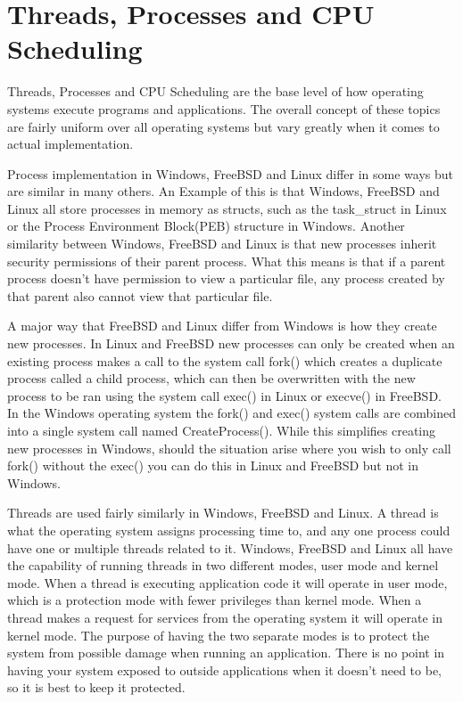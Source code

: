 \documentclass[10pt,serif,draftclsnofoot,onecolumn]{IEEEtran}
\begin{document}
\section{Threads, Processes and CPU Scheduling}
	\par
	Threads, Processes and CPU Scheduling are the base level of how operating systems execute programs and applications. The overall concept of these topics are fairly uniform over all operating systems but vary greatly when it comes to actual implementation.
	\newline
	\par
	Process implementation in Windows, FreeBSD and Linux differ in some ways but are similar in many others. An Example of this is that Windows, FreeBSD and Linux all store processes in memory as structs, such as the task\_struct in Linux\cite{2} or the Process Environment Block(PEB) structure in Windows\cite{3}. Another similarity between Windows, FreeBSD and Linux is that new processes inherit security permissions of their parent process\cite{4}. What this means is that if a parent process doesn't have permission to view a particular file, any process created by that parent also cannot view that particular file.
	\newline
	\par
	A major way that FreeBSD and Linux differ from Windows is how they create new processes. In Linux and FreeBSD new processes can only be created when an existing process makes a call to the system call fork() which creates a duplicate process called a child process, which can then be overwritten with the new process to be ran using the system call exec() in Linux or execve() in FreeBSD\cite{1}. In the Windows operating system the fork() and exec() system calls are combined into a single system call named CreateProcess()\cite{4}. While this simplifies creating new processes in Windows, should the situation arise where you wish to only call fork() without the exec() you can do this in Linux and FreeBSD but not in Windows.
	\newline
	\par
	Threads are used fairly similarly in Windows, FreeBSD and Linux. A thread is what the operating system assigns processing time to, and any one process could have one or multiple threads related to it. Windows, FreeBSD and Linux all have the capability of running threads in two different modes, user mode and kernel mode\cite{1}. When a thread is executing application code it will operate in user mode, which is a protection mode with fewer privileges than kernel mode. When a thread makes a request for services from the operating system it will operate in kernel mode. The purpose of having the two separate modes is to protect the system from possible damage when running an application. There is no point in having your system exposed to outside applications when it doesn't need to be, so it is best to keep it protected.
\end{document}
